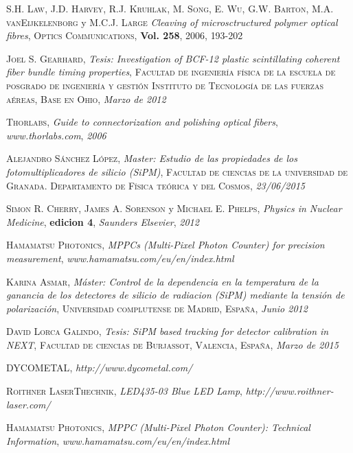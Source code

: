 \begin{thebibliography}{99}
 \textsc{S.H. Law}, \textsc{J.D. Harvey}, \textsc{R.J. Kruhlak}, \textsc{M. Song}, \textsc{E. Wu}, \textsc{G.W. Barton}, \textsc{M.A. vanEijkelenborg} y \textsc{M.C.J. Large}
\textit{Cleaving of microsctructured polymer optical fibres}, \textsc{Optics Communications}, \textbf{Vol. 258}, \textsc{2006}, \textsc{193-202}

 \textsc{Joel S. Gearhard},
\textit{Tesis: Investigation of BCF-12 plastic scintillating coherent fiber bundle timing properties}, \textsc{Facultad de ingeniería física de la escuela de posgrado de ingeniería y gestión} \textsc{Instituto de Tecnología de las fuerzas aéreas, Base en Ohio}, \textit{Marzo de 2012}

 \textsc{Thorlabs},
\textit{Guide to connectorization and polishing optical fibers}, \textit{www.thorlabs.com}, \textit{2006}

 \textsc{Alejandro Sánchez López},
\textit{Master: Estudio de las propiedades de los fotomultiplicadores de silicio (SiPM)}, \textsc{Facultad de ciencias de la universidad de Granada. Departamento de Física teórica y del Cosmos}, \textit{23/06/2015}

 \textsc{Simon R. Cherry}, \textsc{James A. Sorenson} y \textsc{Michael E. Phelps},
\textit{Physics in Nuclear Medicine}, \textbf{edicion 4}, \textit{Saunders Elsevier}, \textit{2012}

 \textsc{Hamamatsu Photonics},
\textit{MPPCs (Multi-Pixel Photon Counter) for precision measurement}, \textit{www.hamamatsu.com/eu/en/index.html}

 \textsc{Karina Asmar},
\textit{Máster: Control de la dependencia en la temperatura de la ganancia de los detectores de silicio de radiacion (SiPM) mediante la tensión de polarización}, \textsc{Universidad complutense de Madrid, España}, \textit{Junio 2012}

 \textsc{David Lorca Galindo},
\textit{Tesis: SiPM based tracking for detector calibration in NEXT}, \textsc{Facultad de ciencias de Burjassot, Valencia, España}, \textit{Marzo de 2015}

 \textsc{DYCOMETAL},
\textit{http://www.dycometal.com/}

 \textsc{Roithner LaserThechnik},
\textit{LED435-03 Blue LED Lamp}, \textit{http://www.roithner-laser.com/}

 \textsc{Hamamatsu Photonics},
\textit{MPPC (Multi-Pixel Photon Counter): Technical Information}, \textit{www.hamamatsu.com/eu/en/index.html}


\end{thebibliography}
